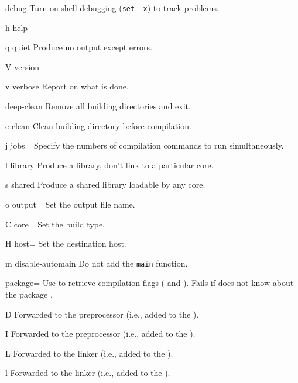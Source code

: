 \begin{options}
\item{debug} Turn on shell debugging (\lstinline|set -x|) to track
   problems.
\item[h]{help} \optionHelp
\item[q]{quiet} Produce no output except errors.
\item[V]{version} \optionVersion
\item[v]{verbose} Report on what is done.
\end{options}

\begin{options}
\item{deep-clean} Remove all building directories and exit.
\item[c]{clean} Clean building directory before compilation.
\item[j]{jobs=} Specify the numbers of compilation commands to run
  simultaneously.
\item[l]{library} Produce a library, don't link to a particular core.
\item[s]{shared} Produce a shared library loadable by any core.
\item[o]{output=} Set the output file name.
\item[C]{core=} Set the build type.
\item[H]{host=} Set the destination host.
\item[m]{disable-automain} Do not add the \lstinline|main| function.
\item{package=} Use  to retrieve compilation
  flags ( and ).  Fails if  does
  not know about the package .
\end{options}

\begin{options}
\item[D\var{symbol}]{} Forwarded to the preprocessor (i.e., added to the
  ).
\item[I\var{path}]{} Forwarded to the preprocessor (i.e., added to the
  ).
\item[L\var{path}]{} Forwarded to the linker (i.e., added to the
  ).
\item[l\var{lib}]{} Forwarded to the linker (i.e., added to the
  ).
\end{options}

